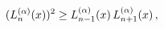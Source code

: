 \[(\mathop{L^{(\alpha)}_{n}\/}\nolimits\!\left(x\right))^{2}\geq\mathop{L^{(%
\alpha)}_{n-1}\/}\nolimits\!\left(x\right)\mathop{L^{(\alpha)}_{n+1}\/}%
\nolimits\!\left(x\right),\]